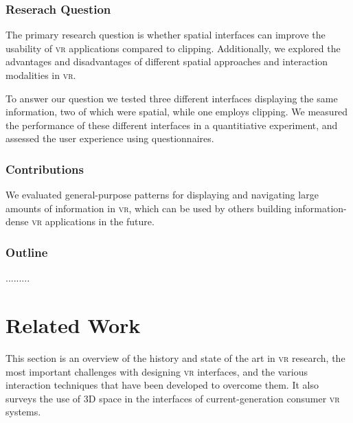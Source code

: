 \documentclass{tufte-book} %
\begin{document}
\subsection{Reserach Question}
The primary research question is whether spatial interfaces can improve the usability of \textsc{vr} applications compared to clipping. Additionally, we explored the advantages and disadvantages of different spatial approaches and interaction modalities in \textsc{vr}.

To answer our question we tested three different interfaces displaying the same information, two of which were spatial, while one employs clipping. We measured the performance of these different interfaces in a quantitiative experiment, and assessed the user experience using questionnaires.

\subsection{Contributions}
We evaluated general-purpose patterns for displaying and navigating large amounts of information in \textsc{vr}, which can be used by others building information-dense \textsc{vr} applications in the future.

\subsection{Outline}

.........



\chapter{Related Work}
\label{ch:related-work}

This section is an overview of the history and state of the art in \textsc{vr} research, the most important challenges with designing \textsc{vr} interfaces, and the various interaction techniques that have been developed to overcome them. It also surveys the use of 3D space in the interfaces of current-generation consumer \textsc{vr} systems.
\end{document}
